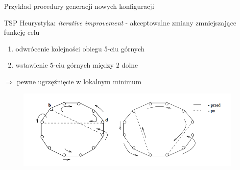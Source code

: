 	\begin{frame}{Przykład procedury generacji nowych konfiguracji}
		\begin{exampleblock}{TSP \cite{lin}}
			Heurystyka: \textit{iterative improvement} - akceptowalne zmiany zmniejszające funkcję celu
			\begin{enumerate}
				\item odwrócenie kolejności obiegu 5-ciu górnych
				\item wstawienie 5-ciu górnych między 2 dolne
			\end{enumerate}	
			$\Rightarrow$ pewne ugrzęźnięcie w lokalnym minimum			
			\begin{figure}
			\includegraphics[height=0.4\textheight]{img/18/tsp}
			\end{figure}
		\end{exampleblock}
	\end{frame}
	

